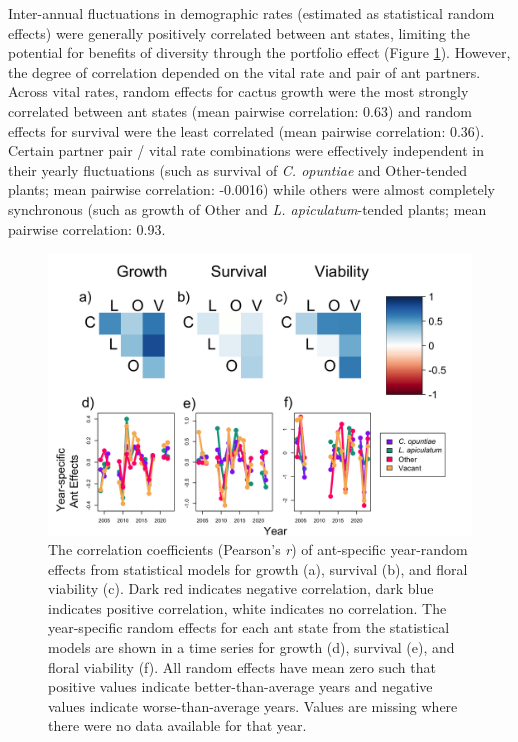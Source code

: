 \documentclass[11pt]{article}
\begin{document}

Inter-annual fluctuations in demographic rates (estimated as statistical random effects) were generally positively correlated between ant states, limiting the potential for benefits of diversity through the portfolio effect (Figure \ref{fig:Annual_Ant}).
However, the degree of correlation depended on the vital rate and pair of ant partners. 
Across vital rates, random effects for cactus growth were the most strongly correlated between ant states (mean pairwise correlation: 0.63) and random effects for survival were the least correlated (mean pairwise correlation: 0.36).  
Certain partner pair / vital rate combinations were effectively independent in their yearly fluctuations (such as survival of \textit{C. opuntiae} and Other-tended plants; mean pairwise correlation: -0.0016) while others were almost completely synchronous (such as growth of Other and \textit{L. apiculatum}-tended plants; mean pairwise correlation: 0.93.

\begin{figure}[H]
	\includegraphics[width=0.75\linewidth]{Figures/corr_RFX.png}
	\caption{
		The correlation coefficients (Pearson's \textit{r}) of ant-specific year-random effects from statistical models for growth (a), survival (b), and floral viability (c).
		Dark red indicates negative correlation, dark blue indicates positive correlation, white indicates no correlation.
		The year-specific random effects for each ant state  from the statistical models are shown in a time series for growth (d), survival (e), and floral viability (f).
		All random effects have mean zero such that positive values indicate better-than-average years and negative values indicate worse-than-average years. 
		Values are missing where there were no data available for that year.}
	\label{fig:Annual_Ant}
\end{figure}
\end{document}

